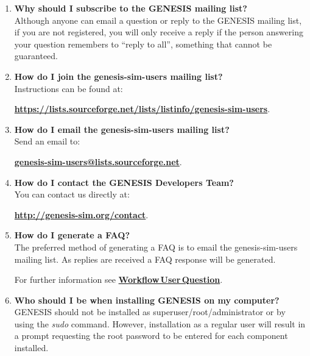\documentclass[12pt]{article}
\begin{document}
\begin{enumerate}

\item {\bf Why should I subscribe to the GENESIS mailing list?} \\
Although anyone can email a question or reply to the GENESIS mailing list, if you are not registered, you will only receive a reply if the person answering your question remembers to ``reply to all'', something that cannot be guaranteed.

\item {\bf How do I join the genesis-sim-users mailing list?} \\
Instructions can be found at:

\href{https://lists.sourceforge.net/lists/listinfo/genesis-sim-users}{\bf https://lists.sourceforge.net/lists/listinfo/genesis-sim-users}.

\item {\bf How do I email the genesis-sim-users mailing list?} \\
Send an email to:

\href{mailto:genesis-sim-users@lists.sourceforge.net}{\bf genesis-sim-users@lists.sourceforge.net}.

\item{\bf How do I contact the GENESIS Developers Team?} \\
You can contact us directly at:

\href{http://genesis-sim.org/contact}{\bf http://genesis-sim.org/contact}.

\item {\bf How do I generate a FAQ?} \\
The preferred method of generating a FAQ is to email the genesis-sim-users mailing list. As replies are received a FAQ response will be generated.

For further information see \href{../workflow-user-query/workflow-user-query.tex}{\bf Workflow\,User\,Question}.

\item {\bf Who should I be when installing GENESIS on my computer?} \\
GENESIS should not be installed as superuser/root/administrator or by using the {\it sudo} command. However, installation as a regular user will result in a prompt requesting the root password to be entered for each component installed. 


\end{enumerate}
\end{document}
